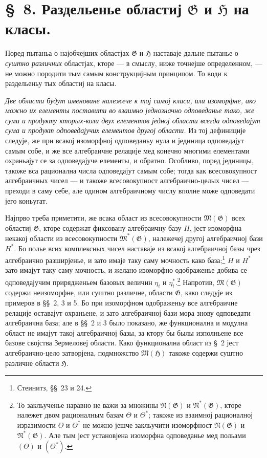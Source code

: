 ﻿\documentclass[11pt]{article}
\begin{document}
\section*{\S\ 8. Раздельенье областиј $\mathfrak G$ и $\mathfrak H$ на класы.}

Поред пытаньа о најобчејших областјах $\mathfrak G$ и $\mathfrak H$ наставаје
дальне пытанье о {\itshape суштно различних} областјах, кторе --- в смыслу,
ниже точнејше определенном, --- не можно породити тым самым конструкцијным
принципом. То води к раздельеньу тых областиј на класы.

{\itshape Две области будут именоване належече к тој самој класи, или
изоморфне, ако можно их елементы поставити во взаимно једнозначно одповеданье
тако, же суми и продукту кторых-коли двух елементов једној области всегда
одповедајут сума и продукт одповедајучих елементов другој области.} Из тој
дефиниције следује, же при всакој изоморфној одповеданьу нула и јединица
одповедајут самым собе, и же все алгебраичне релације мед конечно многими
елементами охраньајут се за одповедајуче елементы, и обратно. Особливо, поред
јединицы, такоже вса рационална числа одповедајут самым собе; тогда как
всесовокупност алгебраичных чисел --- и такоже всесовокупност алгебраично-целых
чисел --- преходи в саму себе, але одином алгебраичному числу вполне може
одповедати јего коньугат.

Најпрво треба приметити, же всака област из всесовокупности
$\mathfrak M(\mathfrak G)$ всех областиј $\mathfrak G$, кторе содержат
фиксовану алгебраичну базу $H$, јест изоморфна некакој области из
всесовокупности $\mathfrak M^*(\mathfrak G)$, належечеј другој алгебраичној
бази $H^*$. Бо полье всих комплексных чисел наставаје из всакој алгебраичној
базы чрез алгебраично разширјенье, и зато имаје таку саму мочность како база;\footnote{Стеинитз,
\S\S\ 23 и 24.} $H$ и $H^*$ зато имајут таку саму мочность, и желано
изоморфно одображенье добива се одповедајучим прирядженьем базовых величин
$\eta_i$ и $\eta_i^*$.\footnote{То закльученье наравно не важи за множины
$\mathfrak N(\mathfrak G)$ и $\mathfrak N^*(\mathfrak G)$, кторе належет двом
рационалным базам $\Theta$ и $\Theta^*$; такоже из взаимној рационалној
изразимости $\Theta$ и $\Theta^*$ не можно јешче закльучити изоморфност
$\mathfrak N(\mathfrak G)$ и $\mathfrak N^*(\mathfrak G)$. Але тым јест
установјена изоморфна одповеданье мед польами $(\Theta)$ и $(\Theta^*)$.}
Напротив, $\mathfrak M(\mathfrak G)$ содержи неизоморфне, или суштно различне,
области $\mathfrak G$, како следује из примеров в \S\S\ 2, 3 и 5. Бо при
изоморфном одображеньу все алгебраичне релације оставајут охраньене, и зато
алгебраичној бази мора знову одповедати алгебраична база; але в \S\S\ 2 и 3
было показано, же функционална и модулна област не имајут такој алгебраичној
базы, за ктору бы былы изполньене все базове својства Зермеловеј области. Како
функционална област из \S\ 2 јест алгебраично-цело затворјена, подмножство
$\mathfrak M(\mathfrak H)$ такоже содержи суштно различне области
$\mathfrak H$.
\end{document}
